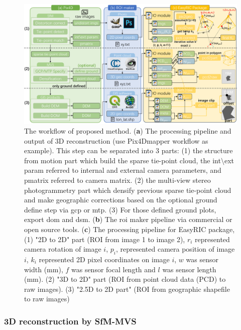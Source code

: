 \documentclass{configs/bmcart}
\begin{document}
\begin{figure}[htpb]
  \centering
  \includegraphics[width=0.95\linewidth]{figures/workflow.pdf}
  \caption{The workflow of proposed method. (\textbf{a}) The processing pipeline and output of 3D reconstruction (use Pix4Dmapper workflow as example). This step can be separated into 3 parts: (1) the structure from motion part which build the sparse tie-point cloud, the int$\setminus$ext param referred to internal and external camera parameters, and pmatrix referred to camera matrix. (2) the multi-view stereo photogrammetry part which densify previous sparse tie-point cloud and make geographic corrections based on the optional ground define step via \acrfull*{gcp} or \acrfull*{mtp}. (3) For those defined ground plots, export \acrfull*{dom} and \acrfull*{dsm}. (\textbf{b}) The \acrfull*{roi} maker pipeline via commercial or open source tools. (\textbf{c}) The processing pipeline for EasyRIC package, (1) "2D to 2D" part (ROI from image 1 to image 2), $r_i$ represented camera rotation of image $i$, $p_i$, represented camera position of image $i$, $k_i$ represented 2D pixel coordinates on image $i$, $w$ was sensor width (mm), $f$ was sensor focal length and $l$ was sensor length (mm). (2) "3D to 2D" part (ROI from point cloud data (PCD) to raw images). (3) "2.5D to 2D part" (ROI from geographic shapefile to raw images)}
  \label{fig:workflow}
\end{figure}

\subsubsection*{3D reconstruction by SfM-MVS}

\end{document}
